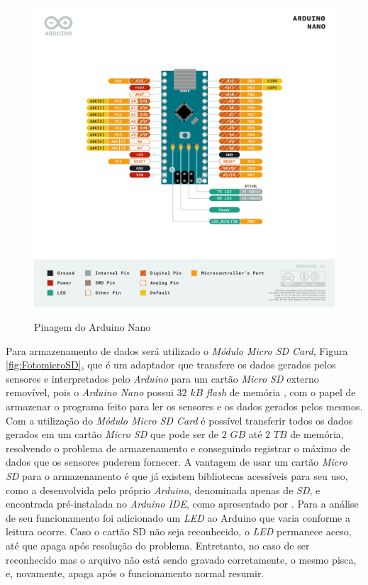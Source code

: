 \documentclass[acronym,symbols,table]{fei}
\begin{document}
\begin{figure}[!htb]
\centering
    \caption{Pinagem do Arduino Nano}
    \includegraphics[width=0.85\linewidth]{Imagens/Pinagem_Arduino_Nano.png}
    \label{fig:pinagem arduino}
\end{figure}

Para armazenamento de dados será utilizado o \textit{Módulo Micro SD Card}, Figura \ref{fig:FotomicroSD}, que é um adaptador que transfere os dados gerados pelos sensores e interpretados pelo \textit{Arduino} para um cartão \textit{Micro SD} externo removível, pois o \textit{Arduino Nano} possui $32$ $kB$ \textit{flash} de memória \cite{UNO}, com o papel de armazenar o programa feito para ler os sensores e os dados gerados pelos mesmos. Com a utilização do \textit{Módulo Micro SD Card} é possível transferir todos os dados gerados em um cartão \textit{Micro SD} que pode ser de $2$ $GB$ até $2$ $TB$ de memória, resolvendo o problema de armazenamento e conseguindo registrar o máximo de dados que os sensores puderem fornecer. A vantagem de usar um cartão \textit{Micro SD} para o armazenamento é que já existem bibliotecas acessíveis para seu uso, como a desenvolvida pelo próprio \textit{Arduino}, denominada apenas de \textit{SD}, e encontrada pré-instalada no \textit{Arduino IDE}, como apresentado por \textcite{ArdMicroSD}. Para a análise de seu funcionamento foi adicionado um \textit{LED} ao Arduino que varia conforme a leitura ocorre. Caso o cartão SD não seja reconhecido, o \textit{LED} permanece aceso, até que apaga após resolução do problema. Entretanto, no caso de ser reconhecido mas o arquivo não está sendo gravado corretamente, o mesmo pisca, e, novamente, apaga após o funcionamento normal resumir.
\end{document}
